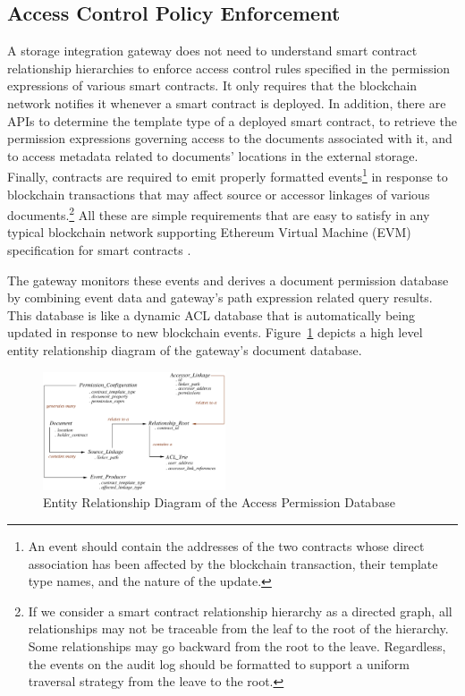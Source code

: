 \documentclass[conference]{IEEEtran}
\begin{document}
\subsection{Access Control Policy Enforcement}
A storage integration gateway does not need to understand smart contract relationship hierarchies to enforce access control rules specified in the permission expressions of various smart contracts. It only requires that the blockchain network notifies it whenever a smart contract is deployed. In addition, there are APIs to determine the template type of a deployed smart contract, to retrieve the permission expressions governing access to the documents associated with it, and to access metadata related to documents' locations in the external storage. Finally, contracts are required to emit properly formatted events\footnote{An event should contain the addresses of the two contracts whose direct association has been affected by the blockchain transaction, their template type names, and the nature of the update.} in response to blockchain transactions that may affect source or accessor linkages of various documents.\footnote{If we consider a smart contract relationship hierarchy as a directed graph, all relationships may not be traceable from the leaf to the root of the hierarchy. Some relationships may go backward from the root to the leave. Regardless, the events on the audit log should be formatted to support a uniform traversal strategy from the leave to the root.} All these are simple requirements that are easy to satisfy in any typical blockchain network supporting Ethereum Virtual Machine (EVM) specification for smart contracts \cite{Wood2014EthereumAS}.

The gateway monitors these events and derives a document permission database by combining event data and gateway's path expression related query results. This database is like a dynamic ACL database that is automatically being updated in response to new blockchain events. Figure~\ref{fig:permission-ERD} depicts a high level entity relationship diagram of the gateway's document database.
\begin{figure}[h]
\label{fig:permission-ERD}
\centering
\includegraphics[width=0.48\textwidth]{permission-db}                    
\caption{Entity Relationship Diagram of the Access Permission Database}
\end{figure}
       
\end{document}
